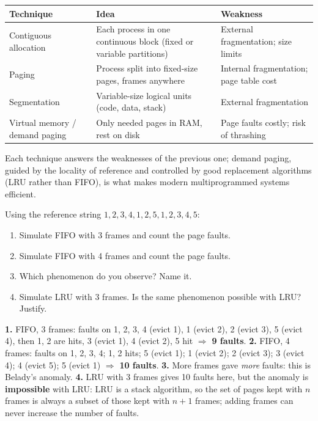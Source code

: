 \documentclass[11pt]{article}
\newcommand{\cle}[1]{{\popxbold\color{popdark}#1}}
\begin{document}
\begin{aretenir}
\begin{center}
\begin{tabularx}{\linewidth}{|l|X|X|}
\hline
\rowcolor{popblueL} \textbf{Technique} & \textbf{Idea} & \textbf{Weakness} \\
\hline
Contiguous allocation & Each process in one continuous block (fixed or variable partitions) & External fragmentation; size limits \\
\hline
Paging & Process split into fixed-size pages, frames anywhere & Internal fragmentation; page table cost \\
\hline
Segmentation & Variable-size logical units (code, data, stack) & External fragmentation \\
\hline
Virtual memory / demand paging & Only needed pages in RAM, rest on disk & Page faults costly; risk of thrashing \\
\hline
\end{tabularx}
\end{center}
Each technique answers the weaknesses of the previous one; demand paging, guided by the locality of reference and controlled by good replacement algorithms (LRU rather than FIFO), is what makes modern multiprogrammed systems efficient.
\end{aretenir}

\begin{exercice}
Using the reference string $1, 2, 3, 4, 1, 2, 5, 1, 2, 3, 4, 5$:
\begin{enumerate}
\item Simulate FIFO with 3 frames and count the page faults.
\item Simulate FIFO with 4 frames and count the page faults.
\item Which phenomenon do you observe? Name it.
\item Simulate LRU with 3 frames. Is the same phenomenon possible with LRU? Justify.
\end{enumerate}
\end{exercice}

\begin{corrige}[Exercise 1]
\textbf{1.} FIFO, 3 frames: faults on 1, 2, 3, 4 (evict 1), 1 (evict 2), 2 (evict 3), 5 (evict 4), then 1, 2 are hits, 3 (evict 1), 4 (evict 2), 5 hit $\Rightarrow$ \textbf{9 faults}.
\textbf{2.} FIFO, 4 frames: faults on 1, 2, 3, 4; 1, 2 hits; 5 (evict 1); 1 (evict 2); 2 (evict 3); 3 (evict 4); 4 (evict 5); 5 (evict 1) $\Rightarrow$ \textbf{10 faults}.
\textbf{3.} More frames gave \emph{more} faults: this is \cle{Belady's anomaly}.
\textbf{4.} LRU with 3 frames gives 10 faults here, but the anomaly is \textbf{impossible} with LRU: LRU is a stack algorithm, so the set of pages kept with $n$ frames is always a subset of those kept with $n+1$ frames; adding frames can never increase the number of faults.
\end{corrige}
\end{document}
